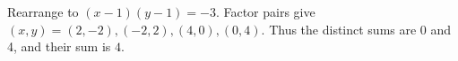 Rearrange to $(x-1)(y-1)=-3$. Factor pairs give $(x,y)=(2,-2),(-2,2),(4,0),(0,4)$. Thus the distinct sums are 0 and 4, and their sum is $\boxed4$.
